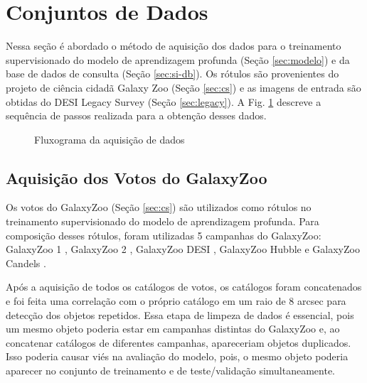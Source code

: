 \section{Conjuntos de Dados}
\label{sec:aquisicao}

Nessa seção é abordado o método de aquisição dos dados para o treinamento supervisionado do modelo de aprendizagem profunda (Seção \ref{sec:modelo}) e da base de dados de consulta (Seção \ref{sec:si-db}). Os rótulos são provenientes do projeto de ciência cidadã Galaxy Zoo (Seção \ref{sec:cs}) e as imagens de entrada são obtidas do DESI Legacy Survey (Seção \ref{sec:legacy}). A Fig. \ref{fig:flow-aquisicao} descreve a sequência de passos realizada para a obtenção desses dados.

\begin{figure}[!ht]
  \centering
  \caption{Fluxograma da aquisição de dados}
  \label{fig:flow-aquisicao}
\end{figure}

\subsection{Aquisição dos Votos do GalaxyZoo}
\label{sec:aquisicao-zoo}

Os votos do GalaxyZoo (Seção \ref{sec:cs}) são utilizados como rótulos no treinamento supervisionado do modelo de aprendizagem profunda. Para composição desses rótulos, foram utilizadas 5 campanhas do GalaxyZoo: GalaxyZoo 1 \citep{gz1}, GalaxyZoo 2 \citep{gz2,gz2-bias}, GalaxyZoo DESI \citep{gz-decals,gz-desi}, GalaxyZoo Hubble \citep{gz-hubble} e GalaxyZoo Candels \citep{gz-candels}.

Após a aquisição de todos os catálogos de votos, os catálogos foram concatenados e foi feita uma correlação com o próprio catálogo em um raio de 8 arcsec para detecção dos objetos repetidos. Essa etapa de limpeza de dados é essencial, pois um mesmo objeto poderia estar em campanhas distintas do GalaxyZoo e, ao concatenar catálogos de diferentes campanhas, apareceriam objetos duplicados. Isso poderia causar viés na avaliação do modelo, pois, o mesmo objeto poderia aparecer no conjunto de treinamento e de teste/validação simultaneamente.

